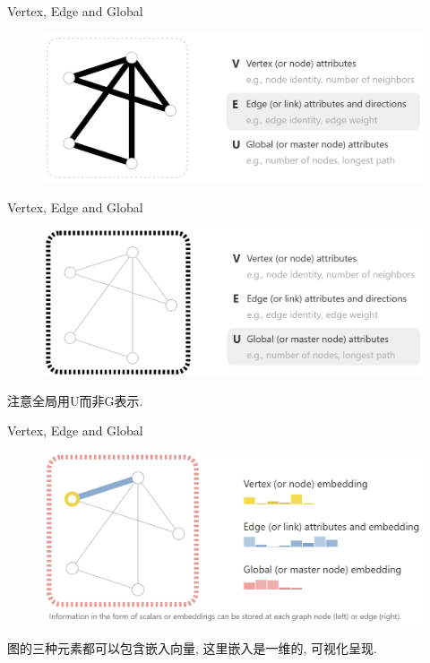 \documentclass{beamer}
\begin{document}
\begin{frame}{Vertex, Edge and Global}
    \begin{figure}
        \includegraphics[width=\textwidth]{edge.png}
    \end{figure}
\end{frame}

\begin{frame}{Vertex, Edge and Global}
    \begin{figure}
        \includegraphics[width=\textwidth]{global.png}
    \end{figure}
    注意全局用U而非G表示.
\end{frame}

\begin{frame}{Vertex, Edge and Global}
    \begin{figure}
        \includegraphics[width=\textwidth]{graph.png}
    \end{figure}
    图的三种元素都可以包含嵌入向量, 这里嵌入是一维的, 可视化呈现.
\end{frame}
\end{document}

